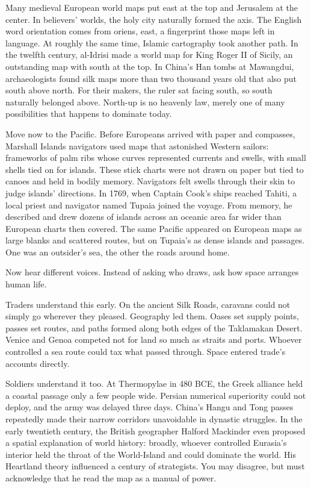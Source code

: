 Many medieval European world maps put east at the top and Jerusalem at the center. In believers' worlds, the holy city naturally formed the axis. The English word orientation comes from oriens, east, a fingerprint those maps left in language. At roughly the same time, Islamic cartography took another path. In the twelfth century, al-Idrisi made a world map for King Roger II of Sicily, an outstanding map with south at the top. In China's Han tombs at Mawangdui, archaeologists found silk maps more than two thousand years old that also put south above north. For their makers, the ruler sat facing south, so south naturally belonged above. North-up is no heavenly law, merely one of many possibilities that happens to dominate today.

Move now to the Pacific. Before Europeans arrived with paper and compasses, Marshall Islands navigators used maps that astonished Western sailors: frameworks of palm ribs whose curves represented currents and swells, with small shells tied on for islands. These stick charts were not drawn on paper but tied to canoes and held in bodily memory. Navigators felt swells through their skin to judge islands' directions. In 1769, when Captain Cook's ships reached Tahiti, a local priest and navigator named Tupaia joined the voyage. From memory, he described and drew dozens of islands across an oceanic area far wider than European charts then covered. The same Pacific appeared on European maps as large blanks and scattered routes, but on Tupaia's as dense islands and passages. One was an outsider's sea, the other the roads around home.

Now hear different voices. Instead of asking who draws, ask how space arranges human life.

Traders understand this early. On the ancient Silk Roads, caravans could not simply go wherever they pleased. Geography led them. Oases set supply points, passes set routes, and paths formed along both edges of the Taklamakan Desert. Venice and Genoa competed not for land so much as straits and ports. Whoever controlled a sea route could tax what passed through. Space entered trade's accounts directly.

Soldiers understand it too. At Thermopylae in 480 BCE, the Greek alliance held a coastal passage only a few people wide. Persian numerical superiority could not deploy, and the army was delayed three days. China's Hangu and Tong passes repeatedly made their narrow corridors unavoidable in dynastic struggles. In the early twentieth century, the British geographer Halford Mackinder even proposed a spatial explanation of world history: broadly, whoever controlled Eurasia's interior held the throat of the World-Island and could dominate the world. His Heartland theory influenced a century of strategists. You may disagree, but must acknowledge that he read the map as a manual of power.

